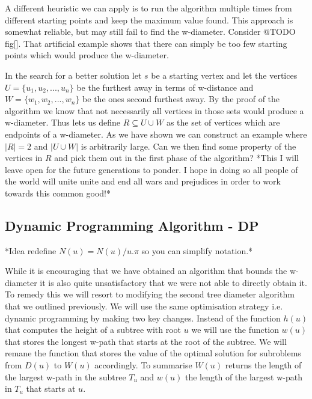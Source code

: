 A different heuristic we can apply is to run the algorithm multiple times from different starting points and keep the maximum value found. This approach is somewhat reliable, but may still fail to find the w-diameter. Consider @TODO fig[]. That artificial example shows that there can simply be too few starting points which would produce the w-diameter.


In the search for a better solution let $s$ be a starting vertex and let the vertices $U = \{u_1, u_2, ..., u_n\}$ be the furthest away in terms of w-distance and $W = \{w_1, w_2, ..., w_n\}$ be the ones second furthest away. By the proof of the algorithm we know that not necessarily all vertices in those sets would produce a w-diameter. Thus lets us define $R \subseteq U \cup W$ as the set of vertices which are endpoints of a w-diameter. As we have shown we can construct an example where $|R| = 2$ and $|U \cup W|$ is arbitrarily large. Can we then find some property of the vertices in $R$ and pick them out in the first phase of the algorithm? *This I will leave open for the future generations to ponder. I hope in doing so all people of the world will unite unite and end all wars and prejudices in order to work towards this common good!*

\subsection{Dynamic Programming Algorithm - DP}


*Idea redefine $N(u) = N(u) / u.\pi$ so you can simplify notation.*

While it is encouraging that we have obtained an algorithm that bounds the w-diameter it is also quite unsatisfactory that we were not able to directly obtain it. To remedy this we will resort to modifying the second tree diameter algorithm that we outlined previously. We will use the same optimisation strategy i.e. dynamic programming by making two key changes. Instead of the function $h(u)$ that computes the height of a subtree with root $u$ we will use the function $w(u)$ that stores the longest w-path that starts at the root of the subtree. We will remane the function that stores the value of the optimal solution for subroblems from $D(u)$ to $W(u)$ accordingly. To summarise $W(u)$ returns the length of the largest w-path in the subtree $T_u$ and $w(u)$ the length of the largest w-path in $T_u$ that starts at $u$.

